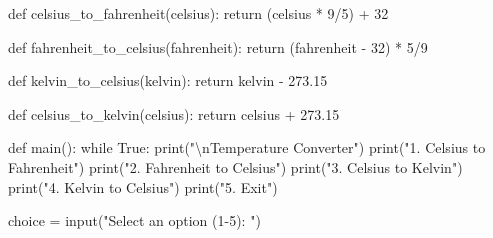 \documentclass[
  letterpaper,
  DIV=11,
  numbers=noendperiod,
  oneside]{scrreprt}
\newenvironment{Shaded}{}{}
\newcommand{\BuiltInTok}[1]{\textcolor[rgb]{0.84,0.23,0.29}{#1}}
\newcommand{\CharTok}[1]{\textcolor[rgb]{0.01,0.18,0.38}{#1}}
\newcommand{\ControlFlowTok}[1]{\textcolor[rgb]{0.84,0.23,0.29}{#1}}
\newcommand{\DecValTok}[1]{\textcolor[rgb]{0.00,0.36,0.77}{#1}}
\newcommand{\FloatTok}[1]{\textcolor[rgb]{0.00,0.36,0.77}{#1}}
\newcommand{\KeywordTok}[1]{\textcolor[rgb]{0.84,0.23,0.29}{#1}}
\newcommand{\NormalTok}[1]{\textcolor[rgb]{0.14,0.16,0.18}{#1}}
\newcommand{\OperatorTok}[1]{\textcolor[rgb]{0.14,0.16,0.18}{#1}}
\newcommand{\StringTok}[1]{\textcolor[rgb]{0.01,0.18,0.38}{#1}}
\newcommand{\VariableTok}[1]{\textcolor[rgb]{0.89,0.38,0.04}{#1}}
\begin{document}
\begin{Shaded}
\begin{Highlighting}[]
\KeywordTok{def}\NormalTok{ celsius\_to\_fahrenheit(celsius):}
    \ControlFlowTok{return}\NormalTok{ (celsius }\OperatorTok{*} \DecValTok{9}\OperatorTok{/}\DecValTok{5}\NormalTok{) }\OperatorTok{+} \DecValTok{32}

\KeywordTok{def}\NormalTok{ fahrenheit\_to\_celsius(fahrenheit):}
    \ControlFlowTok{return}\NormalTok{ (fahrenheit }\OperatorTok{{-}} \DecValTok{32}\NormalTok{) }\OperatorTok{*} \DecValTok{5}\OperatorTok{/}\DecValTok{9}

\KeywordTok{def}\NormalTok{ kelvin\_to\_celsius(kelvin):}
    \ControlFlowTok{return}\NormalTok{ kelvin }\OperatorTok{{-}} \FloatTok{273.15}

\KeywordTok{def}\NormalTok{ celsius\_to\_kelvin(celsius):}
    \ControlFlowTok{return}\NormalTok{ celsius }\OperatorTok{+} \FloatTok{273.15}

\KeywordTok{def}\NormalTok{ main():}
    \ControlFlowTok{while} \VariableTok{True}\NormalTok{:}
        \BuiltInTok{print}\NormalTok{(}\StringTok{"}\CharTok{\textbackslash{}n}\StringTok{Temperature Converter"}\NormalTok{)}
        \BuiltInTok{print}\NormalTok{(}\StringTok{"1. Celsius to Fahrenheit"}\NormalTok{)}
        \BuiltInTok{print}\NormalTok{(}\StringTok{"2. Fahrenheit to Celsius"}\NormalTok{)}
        \BuiltInTok{print}\NormalTok{(}\StringTok{"3. Celsius to Kelvin"}\NormalTok{)}
        \BuiltInTok{print}\NormalTok{(}\StringTok{"4. Kelvin to Celsius"}\NormalTok{)}
        \BuiltInTok{print}\NormalTok{(}\StringTok{"5. Exit"}\NormalTok{)}
        
\NormalTok{        choice }\OperatorTok{=} \BuiltInTok{input}\NormalTok{(}\StringTok{"Select an option (1{-}5): "}\NormalTok{)}
        

\end{Highlighting}
\end{Shaded}
\end{document}
